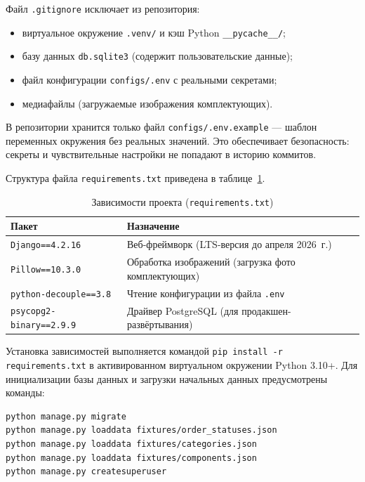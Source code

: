 Файл \texttt{.gitignore} исключает из репозитория:
\begin{itemize}
    \item виртуальное окружение \texttt{.venv/} и кэш Python \texttt{\_\_pycache\_\_/};
    \item базу данных \texttt{db.sqlite3} (содержит пользовательские данные);
    \item файл конфигурации \texttt{configs/.env} с реальными секретами;
    \item медиафайлы (загружаемые изображения комплектующих).
\end{itemize}

В репозитории хранится только файл \texttt{configs/.env.example} --- шаблон переменных окружения без реальных значений. Это обеспечивает безопасность: секреты и чувствительные настройки не попадают в историю коммитов.

Структура файла \texttt{requirements.txt} приведена в таблице~\ref{tab:requirements}.

\begin{table}[ht!]
\caption{Зависимости проекта (\texttt{requirements.txt})}
\label{tab:requirements}
\small
\begin{tabularx}{\textwidth}{|>{\RaggedRight\arraybackslash}p{}|>{\RaggedRight\arraybackslash}X|}
\hline
\textbf{Пакет} & \textbf{Назначение} \\ \hline
\texttt{Django==4.2.16} & Веб-фреймворк (LTS-версия до апреля 2026~г.) \\ \hline
\texttt{Pillow==10.3.0} & Обработка изображений (загрузка фото комплектующих) \\ \hline
\texttt{python-decouple==3.8} & Чтение конфигурации из файла \texttt{.env} \\ \hline
\texttt{psycopg2-binary==2.9.9} & Драйвер PostgreSQL (для продакшен-развёртывания) \\ \hline
\end{tabularx}
\end{table}

Установка зависимостей выполняется командой \texttt{pip install -r requirements.txt} в активированном виртуальном окружении Python 3.10+. Для инициализации базы данных и загрузки начальных данных предусмотрены команды:

\begin{lstlisting}[language=bash, caption={Команды инициализации проекта}]
python manage.py migrate
python manage.py loaddata fixtures/order_statuses.json
python manage.py loaddata fixtures/categories.json
python manage.py loaddata fixtures/components.json
python manage.py createsuperuser
\end{lstlisting}

